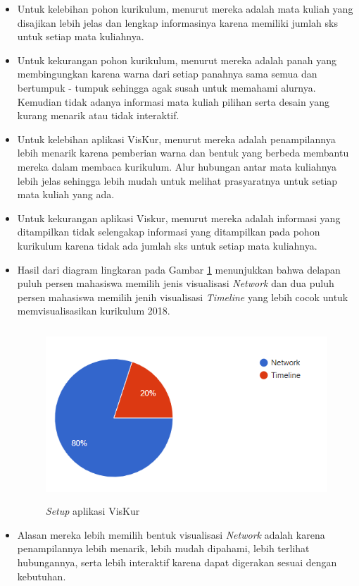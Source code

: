 \begin{itemize}
    \item Untuk kelebihan pohon kurikulum, menurut mereka adalah mata kuliah yang disajikan lebih jelas dan lengkap informasinya karena memiliki jumlah sks untuk setiap mata kuliahnya.
    
    \item Untuk kekurangan pohon kurikulum, menurut mereka adalah panah yang membingungkan karena warna dari setiap panahnya sama semua dan bertumpuk - tumpuk sehingga agak susah untuk memahami alurnya. Kemudian tidak adanya informasi mata kuliah pilihan serta desain yang kurang menarik atau tidak interaktif.
    
    \item Untuk kelebihan aplikasi VisKur, menurut mereka adalah penampilannya lebih menarik karena pemberian warna dan bentuk yang berbeda membantu mereka dalam membaca kurikulum. Alur hubungan antar mata kuliahnya lebih jelas sehingga lebih mudah untuk melihat prasyaratnya untuk setiap mata kuliah yang ada.
    
    \item Untuk kekurangan aplikasi Viskur, menurut mereka adalah informasi yang ditampilkan tidak selengakap informasi yang ditampilkan pada pohon kurikulum karena tidak ada jumlah sks untuk setiap mata kuliahnya.
    
    \item Hasil dari diagram lingkaran pada Gambar \ref{fig:gambarSurvei3} menunjukkan bahwa delapan puluh persen mahasiswa memilih jenis visualisasi \textit{Network} dan dua puluh persen mahasiswa memilih jenih visualisasi \textit{Timeline} yang lebih cocok untuk memvisualisasikan kurikulum 2018.
    
    \begin{figure}[H]
        \centering
        \includegraphics[width=12cm, height=6.5cm]{Gambar/survei3.png}
        \caption{\textit{Setup }aplikasi VisKur}
        \label{fig:gambarSurvei3}
    \end{figure}
    
    \item Alasan mereka lebih memilih bentuk visualisasi \textit{Network} adalah karena penampilannya lebih menarik, lebih mudah dipahami, lebih terlihat hubungannya, serta lebih interaktif karena dapat digerakan sesuai dengan kebutuhan. 
    
\end{itemize}